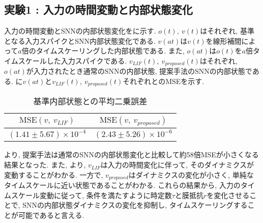 \makeatletter %
\subsection{実験1 : 入力の時間変動と内部状態変化}

入力の時間変動とSNNの内部状態変化をに示す.
$o(t), ~ v(t)$はそれぞれ, 基準となる入力スパイクとSNN内部状態変化である.
$v(at)$は$v(t)$を線形補間によって$a$倍のタイムスケーリングした内部状態である.
また, $o(at)$は$o(t)$を$a$倍タイムスケールした入力スパイクである.
$v_{LIF}(t),~ v_{proposed}(t)$はそれぞれ, $o(at)$が入力されたとき通常のSNNの内部状態, 提案手法のSNNの内部状態である.
に$v(at)$と$v_{LIF}(t),~ v_{proposed}(t)$それぞれとのMSEを示す.
\begin{table}[htb]
    \centering
    \caption{基準内部状態との平均二乗誤差}
    \label{sec4:tab:exp1}
    \begin{tabular}{cc}
        \hline
        $\mathbf{\mathrm{MSE}(\mathit{v,\ v_{LIF}})}$ & $\mathbf{\mathrm{MSE}(\mathit{v,\ v_{proposed}})}$\\
        \hline
        $(1.41 \pm 5.67) \times 10^{-4}$   & $(2.43\pm 5.26 )\times 10^{-6}$
    \end{tabular}
\end{table}

\textbf{}より, 提案手法は通常のSNNの内部状態変化と比較して約58倍MSEが小さくなる結果となった.
また, \textbf{}より, $v_{LIF}$は入力の時間変化に伴って, そのダイナミクスが変動することがわかる.
一方で, $v_{proposed}$はダイナミクスの変化が小さく, 単純なタイムスケールに近い状態であることがわかる.
これらの結果から, 入力のタイムスケール変動に従って, 条件を満たすように時定数$\tau$と膜抵抗$r$を変化させることで, SNNの内部状態ダイナミクスの変化を抑制し, タイムスケーリングすることが可能であると言える.